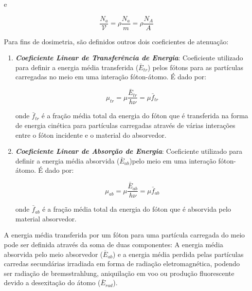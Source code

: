 \documentclass[11pt,a4paper]{article}
\begin{document}
            \noindent e

                \begin{equation}
                    \frac{N_a}{\mathcal{V}} = \rho \frac{N_a}{m} = \rho \frac{N_A}{A}
                \end{equation}

            Para fins de dosimetria, são definidos outros dois coeficientes de atenuação:

            \begin{enumerate}
                \item \textbf{\textit{\textcolor{CarnationPink}{Coeficiente Linear de Transferência de Energia}}}: Coeficiente utilizado para definir a energia média transferida ($\bar{E}_{tr}$) pelos fótons para as partículas carregadas no meio em uma interação fóton-átomo. É dado por:
                
                    \begin{equation}
                        \mu_{tr} = \mu \frac{\bar{E}_{tr}}{h \nu} = \mu \bar{f}_{tr}
                    \end{equation}

                \noindent onde $\bar{f}_{tr}$ é a fração média total da energia do fóton que é transferida na forma de energia cinética para partículas carregadas através de várias interações entre o fóton incidente e o material do absorvedor.
                
                \item \textbf{\textit{\textcolor{CarnationPink}{Coeficiente Linear de Absorção de Energia}}}: Coeficiente utilizado para definir a energia média absorvida ($\bar{E}_{ab}$)pelo meio em uma interação fóton-átomo. É dado por:
                    
                    \begin{equation}
                        \mu_{ab} = \mu \frac{\bar{E}_{ab}}{h \nu} = \mu \bar{f}_{ab}
                    \end{equation}

                \noindent onde $\bar{f}_{ab}$ é a fração média total da energia do fóton que é absorvida pelo material absorvedor.
            \end{enumerate}

            A energia média transferida por um fóton para uma partícula carregada do meio pode ser definida através da soma de duas componentes: A energia média absorvida pelo meio absorvedor ($\bar{E}_{ab}$) e a energia média perdida pelas partículas carredas secundárias irradiada em forma de radiação eletromagnética, podendo ser radiação de bremsstrahlung, aniquilação em voo ou produção fluorescente devido a desexitação do átomo ($\bar{E}_{rad}$).
            
\end{document}
